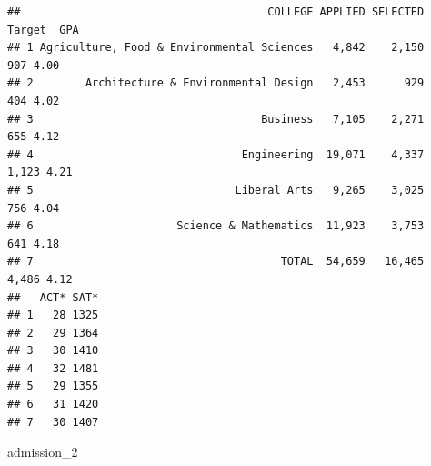 \documentclass[]{book}
\newenvironment{Shaded}{\begin{snugshade}}{\end{snugshade}}
\newcommand{\KeywordTok}[1]{\textcolor[rgb]{0.13,0.29,0.53}{\textbf{#1}}}
\newcommand{\DecValTok}[1]{\textcolor[rgb]{0.00,0.00,0.81}{#1}}
\newcommand{\StringTok}[1]{\textcolor[rgb]{0.31,0.60,0.02}{#1}}
\newcommand{\OperatorTok}[1]{\textcolor[rgb]{0.81,0.36,0.00}{\textbf{#1}}}
\newcommand{\NormalTok}[1]{#1}
\theoremstyle{definition}
\theoremstyle{definition}
\theoremstyle{definition}
\theoremstyle{remark}
\begin{document}
\begin{Shaded}
\end{Shaded}

\begin{verbatim}
##                                      COLLEGE APPLIED SELECTED Target  GPA
## 1 Agriculture, Food & Environmental Sciences   4,842    2,150    907 4.00
## 2        Architecture & Environmental Design   2,453      929    404 4.02
## 3                                   Business   7,105    2,271    655 4.12
## 4                                Engineering  19,071    4,337  1,123 4.21
## 5                               Liberal Arts   9,265    3,025    756 4.04
## 6                      Science & Mathematics  11,923    3,753    641 4.18
## 7                                      TOTAL  54,659   16,465  4,486 4.12
##   ACT* SAT*
## 1   28 1325
## 2   29 1364
## 3   30 1410
## 4   32 1481
## 5   29 1355
## 6   31 1420
## 7   30 1407
\end{verbatim}

\begin{Shaded}
\begin{Highlighting}[]
\NormalTok{admission_}\DecValTok{2}
\end{Highlighting}
\end{Shaded}
\end{document}

